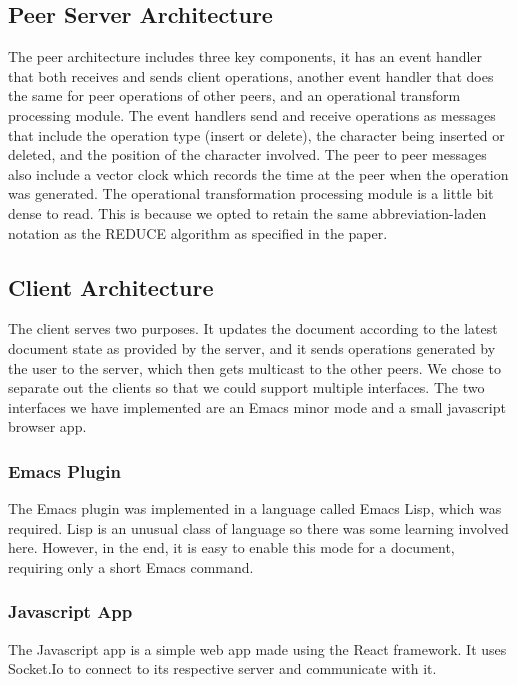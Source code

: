 \documentclass{article}
\begin{document}
\subsection{Peer Server Architecture}
The peer architecture includes three key components, it has an event handler that both receives and sends client operations, another event handler that does the same for peer operations of other peers, and an operational transform processing module. The event handlers send and receive operations as messages that include the operation type (insert or delete), the character being inserted or deleted, and the position of the character involved. The peer to peer messages also include a vector clock which records the time at the peer when the operation was generated. The operational transformation processing module is a little bit dense to read. This is because we opted to retain the same abbreviation-laden notation as the REDUCE algorithm as specified in the paper.\\

\subsection{Client Architecture}
The client serves two purposes. It updates the document according to the latest document state as provided by the server, and it sends operations generated by the user to the server, which then gets multicast to the other peers. We chose to separate out the clients so that we could support multiple interfaces. The two interfaces we have implemented are an Emacs minor mode and a small javascript browser app.\\

\subsubsection{Emacs Plugin}
The Emacs plugin was implemented in a language called Emacs Lisp, which was required. Lisp is an unusual class of language so there was some learning involved here. However, in the end, it is easy to enable this mode for a document, requiring only a short Emacs command.

\subsubsection{Javascript App}
The Javascript app is a simple web app made using the React framework. It uses Socket.Io to connect to its respective server and communicate with it.
\end{document}
